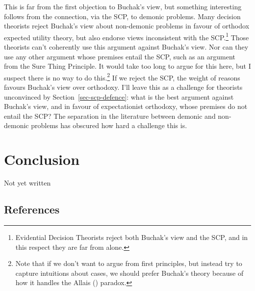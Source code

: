 \documentclass[
  10pt,
  letterpaper,
  DIV=11,
  numbers=noendperiod,
  twoside]{scrartcl}
\begin{document}
This is far from the first objection to Buchak's view, but something
interesting follows from the connection, via the SCP, to demonic
problems. Many decision theorists reject Buchak's view about non-demonic
problems in favour of orthodox expected utility theory, but also endorse
views inconsistent with the SCP.\footnote{Evidential Decision Theorists
  reject both Buchak's view and the SCP, and in this respect they are
  far from alone.} Those theorists can't coherently use this argument
against Buchak's view. Nor can they use any other argument whose
premises entail the SCP, such as an argument from the Sure Thing
Principle. It would take too long to argue for this here, but I suspect
there is no way to do this.\footnote{Note that if we don't want to argue
  from first principles, but instead try to capture intuitions about
  cases, we should prefer Buchak's theory because of how it handles the
  Allais () paradox.} If we reject the
SCP, the weight of reasons favours Buchak's view over orthodoxy. I'll
leave this as a challenge for theorists unconvinced by
Section~\ref{sec-scp-defence}: what is the best argument against
Buchak's view, and in favour of expectationist orthodoxy, whose premises
do not entail the SCP? The separation in the literature between demonic
and non-demonic problems has obscured how hard a challenge this is.

\section{Conclusion}\label{sec-conclusion}

Not yet written

\subsection*{References}\label{references}
\end{document}
